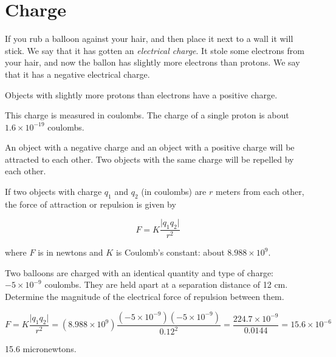 \chapter{Charge}

If you rub a balloon against your hair, and then place it next to a wall it will stick. We
say that it has gotten an \textit{electrical charge}. It stole some
electrons from your hair, and now the ballon has slightly more
electrons than protons. We say that it has a negative electrical
charge.

Objects with slightly more protons than electrons have a positive charge.

This charge is measured in coulombs. The charge of a single proton is
about $1.6 \times 10^{-19}$ coulombs.

An object with a negative charge and an object with a positive charge
will be attracted to each other. Two objects with the same charge will
be repelled by each other.

\begin{mdframed}[style=important, frametitle={Coulomb's Law}]

  If two objects with charge $q_1$ and $q_2$ (in coulombs) are $r$ meters from each other, the force of attraction or repulsion is given by

  $$F = K\frac{\lvert q_1 q_2 \rvert}{r^2}$$

    where $F$ is in newtons and $K$ is Coulomb's constant: about $8.988 \times 10^9$.
  
\end{mdframed}


\begin{Exercise}[title={Coulomb's Law}, label=charged_balloons]

Two balloons are charged with an identical quantity and type of
charge: $-5 \times 10^{-9}$ coulombs. They are held apart at a
separation distance of 12 cm. Determine the magnitude of the
electrical force of repulsion between them. 
  
\end{Exercise}
\begin{Answer}[ref=charged_balloons]

  $$F = K\frac{\lvert q_1 q_2 \rvert}{r^2} = (8.988 \times 10^9) \frac{(-5 \times 10^{-9})(-5 \times 10^{-9})}{0.12^2} = \frac{224.7 \times 10^{-9}}{0.0144} = 15.6 \times 10^{-6}$$

  15.6 micronewtons.
  
\end{Answer}

